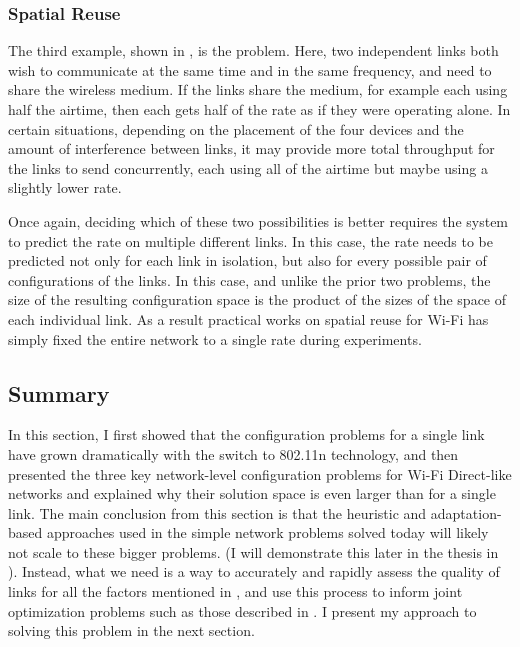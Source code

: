 \subsubsection{Spatial Reuse}
The third example, shown in , is the  problem. Here, two independent links both wish to communicate at the same time and in the same frequency, and need to share the wireless medium. If the links share the medium, for example each using half the airtime, then each gets half of the rate as if they were operating alone. In certain situations, depending on the placement of the four devices and the amount of interference between links, it may provide more total throughput for the links to send concurrently, each using all of the airtime but maybe using a slightly lower rate.

Once again, deciding which of these two possibilities is better requires the system to predict the rate on multiple different links. In this case, the rate needs to be predicted not only for each link in isolation, but also for every possible pair of configurations of the links. In this case, and unlike the prior two problems, the size of the resulting configuration space is the product of the sizes of the space of each individual link. As a result%
practical works on spatial reuse for Wi-Fi has simply fixed the entire network to a single rate during experiments.

\subsection{Summary}
In this section, I first showed that the configuration problems for a single link have grown dramatically with the switch to 802.11n technology, and then presented the three key network-level configuration problems for Wi-Fi Direct-like networks and explained why their solution space is even larger than for a single link. The main conclusion from this section is that the heuristic and adaptation-based approaches used in the simple network problems solved today will likely not scale to these bigger problems. (I will demonstrate this later in the thesis in ). Instead, what we need is a way to accurately and rapidly assess the quality of links for all the factors mentioned in , and use this process to inform joint optimization problems such as those described in . I present my approach to solving this problem in the next section.

